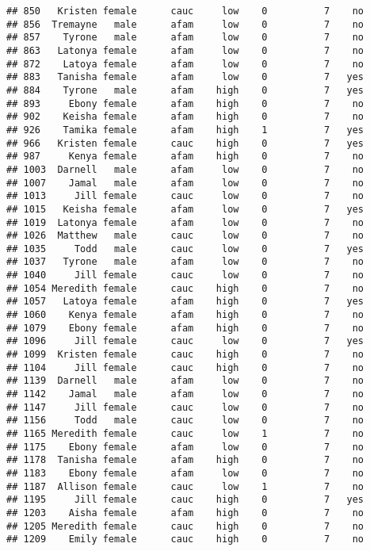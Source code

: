 \documentclass[
]{article}
\begin{document}
\begin{verbatim}
## 850   Kristen female      cauc     low    0          7    no
## 856  Tremayne   male      afam     low    0          7    no
## 857    Tyrone   male      afam     low    0          7    no
## 863   Latonya female      afam     low    0          7    no
## 872    Latoya female      afam     low    0          7    no
## 883   Tanisha female      afam     low    0          7   yes
## 884    Tyrone   male      afam    high    0          7   yes
## 893     Ebony female      afam    high    0          7    no
## 902    Keisha female      afam    high    0          7    no
## 926    Tamika female      afam    high    1          7   yes
## 966   Kristen female      cauc    high    0          7   yes
## 987     Kenya female      afam    high    0          7    no
## 1003  Darnell   male      afam     low    0          7    no
## 1007    Jamal   male      afam     low    0          7    no
## 1013     Jill female      cauc     low    0          7    no
## 1015   Keisha female      afam     low    0          7   yes
## 1019  Latonya female      afam     low    0          7    no
## 1026  Matthew   male      cauc     low    0          7    no
## 1035     Todd   male      cauc     low    0          7   yes
## 1037   Tyrone   male      afam     low    0          7    no
## 1040     Jill female      cauc     low    0          7    no
## 1054 Meredith female      cauc    high    0          7    no
## 1057   Latoya female      afam    high    0          7   yes
## 1060    Kenya female      afam    high    0          7    no
## 1079    Ebony female      afam    high    0          7    no
## 1096     Jill female      cauc     low    0          7   yes
## 1099  Kristen female      cauc    high    0          7    no
## 1104     Jill female      cauc    high    0          7    no
## 1139  Darnell   male      afam     low    0          7    no
## 1142    Jamal   male      afam     low    0          7    no
## 1147     Jill female      cauc     low    0          7    no
## 1156     Todd   male      cauc     low    0          7    no
## 1165 Meredith female      cauc     low    1          7    no
## 1175    Ebony female      afam     low    0          7    no
## 1178  Tanisha female      afam    high    0          7    no
## 1183    Ebony female      afam     low    0          7    no
## 1187  Allison female      cauc     low    1          7    no
## 1195     Jill female      cauc    high    0          7   yes
## 1203    Aisha female      afam    high    0          7    no
## 1205 Meredith female      cauc    high    0          7    no
## 1209    Emily female      cauc    high    0          7    no

\end{verbatim}
\end{document}
